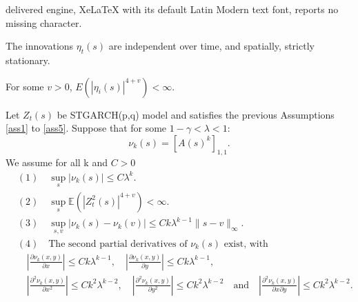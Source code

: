 \documentclass[10pt,a4paper]{amsart}
\begin{document}
delivered engine, XeLaTeX with its default Latin Modern text font, reports no missing character.
\begin{assumption}\label{ass1}
  The innovations $ \eta_t(s) $ are independent over time, and spatially, strictly stationary. 
\end{assumption}

\begin{assumption}\label{ass5} 
For some $v>0$, $E\left(\left|\eta _i(s)\right|^{4+v}\right)<\infty$. 
\end{assumption}

\begin{lemmaB}\label{lem}
Let $Z_t(s)$ be  STGARCH(p,q) model  and satisfies the previous Assumptions \ref{ass1} to \ref{ass5}. Suppose that for some $1-\gamma<\lambda<1$: $$\nu_k(s) =  [A(s)^k]_{1,1}.$$  We assume for all k and $ C > 0$
\begin{align*}
&(1) \quad \sup_{s} |\nu_k(s)| \leq C \lambda^k. \\
&(2) \quad \sup_s \mathbb{E}(|Z_t^2(s)|^{4 + v}) < \infty. \\
&(3) \quad \sup_{s,v} |\nu_k(s) - \nu_k(v)| \leq C k \lambda^{k-1} \|s - v\|_{\infty}. \\
&(4) \quad \text{The second partial derivatives of } \nu_k(s)  \text{ exist, with} \\
&\quad \left| \frac{\partial \nu_k(x,y)}{\partial x } \right| \leq C k \lambda^{k-1}, \quad 
\left| \frac{\partial \nu_k(x,y)}{\partial y } \right| \leq Ck \lambda^{k-1}, \\
&\quad \left| \frac{\partial^2 \nu_k(x,y)}{\partial x^2} \right| \leq Ck^2 \lambda^{k-2}, \quad \left| \frac{\partial^2 \nu_k(x,y)}{\partial y^2} \right| \leq Ck^2 \lambda^{k-2} \quad \text{and} \quad \left| \frac{\partial^2 \nu_k(x,y)}{\partial x \partial y} \right| \leq Ck^2 \lambda^{k-2}.
\end{align*}
\end{lemmaB}
\end{document}
